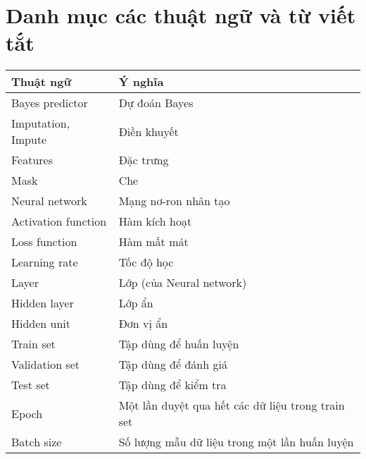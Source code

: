 \section*{Danh mục các thuật ngữ và từ viết tắt}

\setlength{\tabcolsep}{18pt}
\begin{tabular}{ll}
    \textbf{Thuật ngữ} & \textbf{Ý nghĩa} \\
    \hline
    Bayes predictor & Dự đoán Bayes \\
    Imputation, Impute & Điền khuyết \\
    Features & Đặc trưng \\
    Mask & Che \\
    Neural network & Mạng nơ-ron nhân tạo \\
    Activation function & Hàm kích hoạt \\
    Loss function & Hàm mất mát \\
    Learning rate & Tốc độ học \\
    Layer & Lớp (của Neural network) \\
    Hidden layer & Lớp ẩn\\
    Hidden unit & Đơn vị ẩn \\
    Train set & Tập dùng để huấn luyện \\
    Validation set & Tập dùng để đánh giá \\
    Test set & Tập dùng để kiểm tra \\
    Epoch & Một lần duyệt qua hết các dữ liệu trong train set \\
    Batch size & Số lượng mẫu dữ liệu trong một lần huấn luyện \\
\end{tabular}


